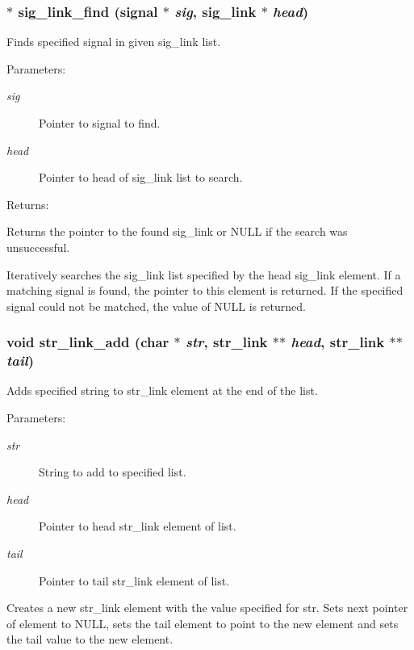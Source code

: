 \subsubsection{$\ast$ sig\_\-link\_\-find ({\bf signal} $\ast$ {\em sig}, {\bf sig\_\-link} $\ast$ {\em head})}\label{link_8h_a10}


Finds specified signal in given sig\_\-link list.

\begin{Desc}
\item[Parameters: ]\par
\begin{description}
\item[{\em 
sig}]Pointer to signal to find. \item[{\em 
head}]Pointer to head of sig\_\-link list to search. \end{description}
\end{Desc}
\begin{Desc}
\item[Returns: ]\par
Returns the pointer to the found sig\_\-link or NULL if the search was unsuccessful.\end{Desc}
Iteratively searches the sig\_\-link list specified by the head sig\_\-link element. If a matching signal is found, the pointer to this element is returned. If the specified signal could not be matched, the value of NULL is returned. 
\subsubsection{\setlength{\rightskip}{0pt plus 5cm}void str\_\-link\_\-add (char $\ast$ {\em str}, {\bf str\_\-link} $\ast$$\ast$ {\em head}, {\bf str\_\-link} $\ast$$\ast$ {\em tail})}\label{link_8h_a0}


Adds specified string to str\_\-link element at the end of the list.

\begin{Desc}
\item[Parameters: ]\par
\begin{description}
\item[{\em 
str}]String to add to specified list. \item[{\em 
head}]Pointer to head str\_\-link element of list. \item[{\em 
tail}]Pointer to tail str\_\-link element of list.\end{description}
\end{Desc}
Creates a new str\_\-link element with the value specified for str. Sets next pointer of element to NULL, sets the tail element to point to the new element and sets the tail value to the new element. 
